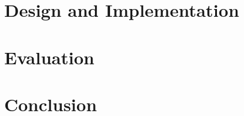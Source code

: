 \documentclass{UoYCSproject}
\begin{document}
\chapter{Design and Implementation}

\chapter{Evaluation}

\chapter{Conclusion}

\printbibliography
\end{document}
